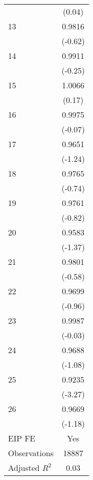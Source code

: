 {\begin{tabular}{l*{1}{c}}
                                   &      (0.04)         \\
[1em]
   13                              &      0.9816         \\
                                   &     (-0.62)         \\
[1em]
   14                              &      0.9911         \\
                                   &     (-0.25)         \\
[1em]
   15                              &      1.0066         \\
                                   &      (0.17)         \\
[1em]
   16                              &      0.9975         \\
                                   &     (-0.07)         \\
[1em]
   17                              &      0.9651         \\
                                   &     (-1.24)         \\
[1em]
   18                              &      0.9765         \\
                                   &     (-0.74)         \\
[1em]
   19                              &      0.9761         \\
                                   &     (-0.82)         \\
[1em]
   20                              &      0.9583         \\
                                   &     (-1.37)         \\
[1em]
   21                              &      0.9801         \\
                                   &     (-0.58)         \\
[1em]
   22                              &      0.9699         \\
                                   &     (-0.96)         \\
[1em]
   23                              &      0.9987         \\
                                   &     (-0.03)         \\
[1em]
   24                              &      0.9688         \\
                                   &     (-1.08)         \\
[1em]
   25                              &      0.9235\sym{***}\\
                                   &     (-3.27)         \\
[1em]
   26                              &      0.9669         \\
                                   &     (-1.18)         \\
[1em]
EIP FE                             &         Yes         \\
\hline
Observations                       &       18887         \\
Adjusted \(R^{2}\)                 &        0.03         \\
\hline\hline
\end{tabular}
}
